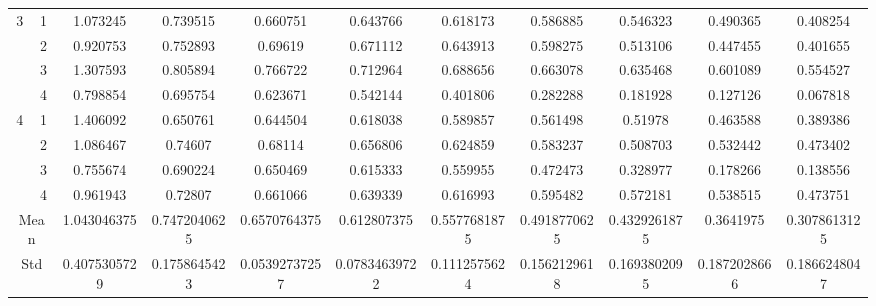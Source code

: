 \documentclass[draft,dvipsnames]{drexel-thesis}
\begin{document}
\begin{thesis}
\begin{table}[!t]
{\begin{tabular}{|c|c|c|c|c|c|c|c|c|c|c|}
\multirow{4}{*}{3}    & 1                   & 1.073245     & 0.739515     & 0.660751      & 0.643766      & 0.618173     & 0.586885     & 0.546323     & 0.490365     & 0.408254     \\ \cline{2-11} 
                      & 2                   & 0.920753     & 0.752893     & 0.69619       & 0.671112      & 0.643913     & 0.598275     & 0.513106     & 0.447455     & 0.401655     \\ \cline{2-11} 
                      & 3                   & 1.307593     & 0.805894     & 0.766722      & 0.712964      & 0.688656     & 0.663078     & 0.635468     & 0.601089     & 0.554527     \\ \cline{2-11} 
                      & 4                   & 0.798854     & 0.695754     & 0.623671      & 0.542144      & 0.401806     & 0.282288     & 0.181928     & 0.127126     & 0.067818     \\ \hline
\multirow{4}{*}{4}    & 1                   & 1.406092     & 0.650761     & 0.644504      & 0.618038      & 0.589857     & 0.561498     & 0.51978      & 0.463588     & 0.389386     \\ \cline{2-11} 
                      & 2                   & 1.086467     & 0.74607      & 0.68114       & 0.656806      & 0.624859     & 0.583237     & 0.508703     & 0.532442     & 0.473402     \\ \cline{2-11} 
                      & 3                   & 0.755674     & 0.690224     & 0.650469      & 0.615333      & 0.559955     & 0.472473     & 0.328977     & 0.178266     & 0.138556     \\ \cline{2-11} 
                      & 4                   & 0.961943     & 0.72807      & 0.661066      & 0.639339      & 0.616993     & 0.595482     & 0.572181     & 0.538515     & 0.473751     \\ \hline
\multicolumn{2}{|c|}{Mean}                  & 1.043046375  & 0.7472040625 & 0.6570764375  & 0.612807375   & 0.5577681875 & 0.4918770625 & 0.4329261875 & 0.3641975    & 0.3078613125 \\ \hline
\multicolumn{2}{|c|}{Std}                   & 0.4075305729 & 0.1758645423 & 0.05392737257 & 0.07834639722 & 0.1112575624 & 0.1562129618 & 0.1693802095 & 0.1872028666 & 0.1866248047 \\ \hline
\end{tabular}}
\end{table}


\end{thesis}
\end{document}
